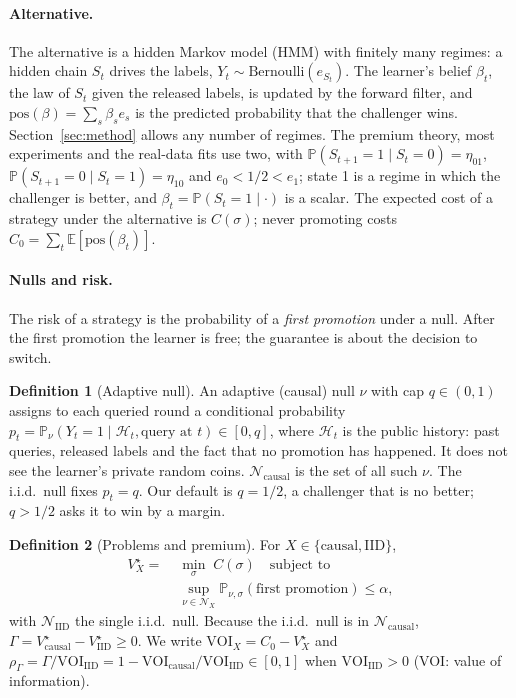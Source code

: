 \documentclass{article}
\theoremstyle{plain}
\theoremstyle{definition}
\newtheorem{definition}{Definition}
\theoremstyle{remark}
\newcommand{\PP}{\mathbb{P}}
\newcommand{\E}{\mathbb{E}}
\newcommand{\Vc}{V^\star_{\mathrm{causal}}}
\newcommand{\Vi}{V^\star_{\mathrm{IID}}}
\newcommand{\rhoG}{\rho_\Gamma}
\newcommand{\pos}{\mathrm{pos}}
\newcommand{\Ncaus}{\mathcal{N}_{\mathrm{causal}}}
\begin{document}
\paragraph{Alternative.} The alternative is a hidden Markov model (HMM) with finitely many regimes: a hidden chain $S_t$ drives the labels, $Y_t\sim\mathrm{Bernoulli}(e_{S_t})$. The learner's belief $\beta_t$, the law of $S_t$ given the released labels, is updated by the forward filter, and $\pos(\beta)=\sum_s\beta_s e_s$ is the predicted probability that the challenger wins. Section~\ref{sec:method} allows any number of regimes. The premium theory, most experiments and the real-data fits use two, with $\PP(S_{t+1}=1\mid S_t=0)=\eta_{01}$, $\PP(S_{t+1}=0\mid S_t=1)=\eta_{10}$ and $e_0<1/2<e_1$; state 1 is a regime in which the challenger is better, and $\beta_t=\PP(S_t=1\mid\cdot)$ is a scalar. The expected cost of a strategy under the alternative is $C(\sigma)$; never promoting costs $C_0=\sum_t\E[\pos(\beta_t)]$.

\paragraph{Nulls and risk.} The risk of a strategy is the probability of a \emph{first promotion} under a null. After the first promotion the learner is free; the guarantee is about the decision to switch.

\begin{definition}[Adaptive null]
\label{def:null}
An adaptive (causal) null $\nu$ with cap $q\in(0,1)$ assigns to each queried round a conditional probability $p_t=\PP_\nu(Y_t=1\mid\mathcal{H}_t,\text{query at }t)\in[0,q]$, where $\mathcal{H}_t$ is the public history: past queries, released labels and the fact that no promotion has happened. It does not see the learner's private random coins. $\Ncaus$ is the set of all such $\nu$. The i.i.d.\ null fixes $p_t=q$. Our default is $q=1/2$, a challenger that is no better; $q>1/2$ asks it to win by a margin.
\end{definition}

\begin{definition}[Problems and premium]
For $X\in\{\mathrm{causal},\mathrm{IID}\}$,
\begin{align*}
V^\star_X=\;&\min_{\sigma}\;C(\sigma)\quad\text{subject to}\\
&\sup_{\nu\in\mathcal{N}_X}\PP_{\nu,\sigma}(\text{first promotion})\le\alpha,
\end{align*}
with $\mathcal{N}_{\mathrm{IID}}$ the single i.i.d.\ null. Because the i.i.d.\ null is in $\Ncaus$, $\Gamma=\Vc-\Vi\ge 0$. We write $\mathrm{VOI}_X=C_0-V^\star_X$ and $\rhoG=\Gamma/\mathrm{VOI}_{\mathrm{IID}}=1-\mathrm{VOI}_{\mathrm{causal}}/\mathrm{VOI}_{\mathrm{IID}}\in[0,1]$ when $\mathrm{VOI}_{\mathrm{IID}}>0$ (VOI: value of information).
\end{definition}
\end{document}
